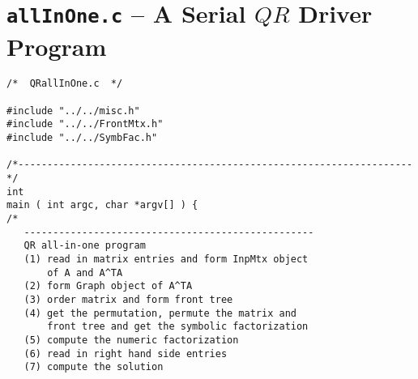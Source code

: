 \vfill \eject
\section{{\tt allInOne.c} -- A Serial $QR$ Driver Program}
\label{section:QR-serial-driver}

\begin{verbatim}
/*  QRallInOne.c  */

#include "../../misc.h"
#include "../../FrontMtx.h"
#include "../../SymbFac.h"

/*--------------------------------------------------------------------*/
int
main ( int argc, char *argv[] ) {
/*
   --------------------------------------------------
   QR all-in-one program
   (1) read in matrix entries and form InpMtx object
       of A and A^TA
   (2) form Graph object of A^TA
   (3) order matrix and form front tree
   (4) get the permutation, permute the matrix and 
       front tree and get the symbolic factorization
   (5) compute the numeric factorization
   (6) read in right hand side entries
   (7) compute the solution


\end{verbatim}
